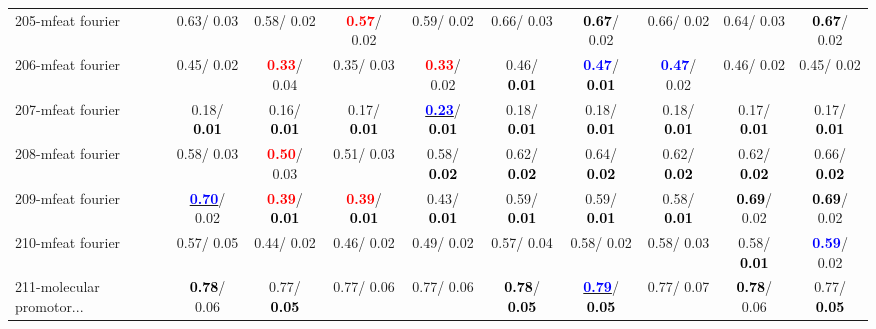 \begin{table}[h]
\begin{center}
{\begin{tabular}{lc|c|c|c|c|c|c|c|c}
205-mfeat fourier &   0.63/  0.03 &   0.58/  0.02 & \textcolor{red}{\textbf{  0.57}}/  0.02 &   0.59/  0.02 &   0.66/  0.03 & \textcolor{black}{\textbf{  0.67}}/  0.02 &   0.66/  0.02 &   0.64/  0.03 & \textcolor{black}{\textbf{  0.67}}/  0.02 \\
206-mfeat fourier &   0.45/  0.02 & \textcolor{red}{\textbf{  0.33}}/  0.04 &   0.35/  0.03 & \textcolor{red}{\textbf{  0.33}}/  0.02 &   0.46/\textcolor{black}{\textbf{  0.01}} & \textcolor{blue}{\textbf{  0.47}}/\textcolor{black}{\textbf{  0.01}} & \textcolor{blue}{\textbf{  0.47}}/  0.02 &   0.46/  0.02 &   0.45/  0.02 \\ \hline
207-mfeat fourier &   0.18/\textcolor{black}{\textbf{  0.01}} &   0.16/\textcolor{black}{\textbf{  0.01}} &   0.17/\textcolor{black}{\textbf{  0.01}} & \underline{\textcolor{blue}{\textbf{  0.23}}}/\textcolor{black}{\textbf{  0.01}} &   0.18/\textcolor{black}{\textbf{  0.01}} &   0.18/\textcolor{black}{\textbf{  0.01}} &   0.18/\textcolor{black}{\textbf{  0.01}} &   0.17/\textcolor{black}{\textbf{  0.01}} &   0.17/\textcolor{black}{\textbf{  0.01}} \\
208-mfeat fourier &   0.58/  0.03 & \textcolor{red}{\textbf{  0.50}}/  0.03 &   0.51/  0.03 &   0.58/\textcolor{black}{\textbf{  0.02}} &   0.62/\textcolor{black}{\textbf{  0.02}} &   0.64/\textcolor{black}{\textbf{  0.02}} &   0.62/\textcolor{black}{\textbf{  0.02}} &   0.62/\textcolor{black}{\textbf{  0.02}} &   0.66/\textcolor{black}{\textbf{  0.02}} \\
209-mfeat fourier & \underline{\textcolor{blue}{\textbf{  0.70}}}/  0.02 & \textcolor{red}{\textbf{  0.39}}/\textcolor{black}{\textbf{  0.01}} & \textcolor{red}{\textbf{  0.39}}/\textcolor{black}{\textbf{  0.01}} &   0.43/\textcolor{black}{\textbf{  0.01}} &   0.59/\textcolor{black}{\textbf{  0.01}} &   0.59/\textcolor{black}{\textbf{  0.01}} &   0.58/\textcolor{black}{\textbf{  0.01}} & \textcolor{black}{\textbf{  0.69}}/  0.02 & \textcolor{black}{\textbf{  0.69}}/  0.02 \\
210-mfeat fourier &   0.57/  0.05 &   0.44/  0.02 &   0.46/  0.02 &   0.49/  0.02 &   0.57/  0.04 &   0.58/  0.02 &   0.58/  0.03 &   0.58/\textcolor{black}{\textbf{  0.01}} & \textcolor{blue}{\textbf{  0.59}}/  0.02 \\
211-molecular promotor... & \textcolor{black}{\textbf{  0.78}}/  0.06 &   0.77/\textcolor{black}{\textbf{  0.05}} &   0.77/  0.06 &   0.77/  0.06 & \textcolor{black}{\textbf{  0.78}}/\textcolor{black}{\textbf{  0.05}} & \underline{\textcolor{blue}{\textbf{  0.79}}}/\textcolor{black}{\textbf{  0.05}} &   0.77/  0.07 & \textcolor{black}{\textbf{  0.78}}/  0.06 &   0.77/\textcolor{black}{\textbf{  0.05}} \\

\end{tabular}}
\end{center}
\end{table}
